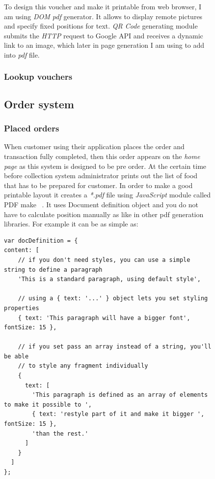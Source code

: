 \begin{figure}
To design this voucher and make it printable from web browser, I am using \textit{DOM pdf} generator. It allows to display remote pictures and specify fixed positions for text. \textit{QR Code} generating module submits the \textit{HTTP} request to Google API and receives a dynamic link to an image, which later in page generation I am using to add into \textit{pdf} file.


	\subsubsection{Lookup vouchers}
	

	\subsection{Order system}
		\subsubsection{Placed orders}
			When customer using their application places the order and transaction fully completed, then this order appears on the \textit{home page} as this system is designed to be pre order. At the certain time before collection system administrator prints out the list of food that has to be prepared for customer. In order to make a good printable layout it creates a \textit{*.pdf} file using \textit{JavaScript} module called PDF make ~\cite{PDF_Make_module}. It uses Document definition object and you do not have to calculate position manually as like in other pdf generation libraries. For example it can be as simple as:
			\\
			\begin{verbatim}
var docDefinition = {
content: [
    // if you don't need styles, you can use a simple string to define a paragraph
    'This is a standard paragraph, using default style',

    // using a { text: '...' } object lets you set styling properties
    { text: 'This paragraph will have a bigger font', fontSize: 15 },

    // if you set pass an array instead of a string, you'll be able
    // to style any fragment individually
    {
      text: [
        'This paragraph is defined as an array of elements to make it possible to ',
        { text: 'restyle part of it and make it bigger ', fontSize: 15 },
        'than the rest.'
      ]
    }
  ]
};
			\end{verbatim}
			

\end{figure}
